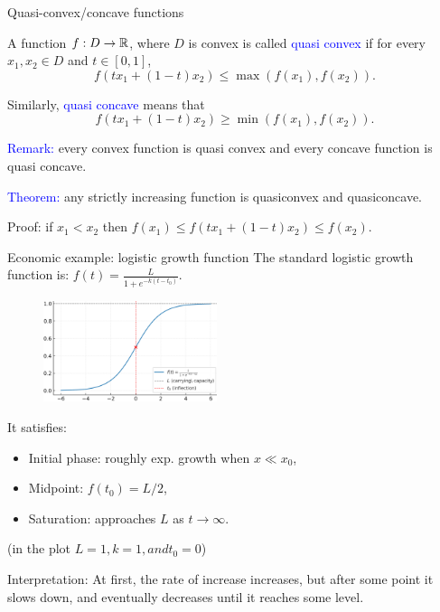 \documentclass[11pt,aspectratio=169]{beamer}
\begin{document}
\begin{frame}{Quasi-convex/concave functions}


A function $f:D \rightarrow \mathbb R$, where $D$ is convex is called \textcolor{blue}{quasi convex} if for every  $x_1,x_2 \in D$ and $t \in [0,1]$, 
$$f(t x_1+(1-t)x_2)\leq \max(f(x_1), f(x_2)).$$


Similarly, \textcolor{blue}{quasi concave} means that
$$f(t x_1+(1-t)x_2)\geq \min(f(x_1), f(x_2)).$$

\vskip 12pt
\textcolor{blue}{Remark:} every convex function is quasi convex and every concave function is quasi concave.
\vskip 12pt

\textcolor{blue}{Theorem:} any strictly increasing function is quasiconvex and quasiconcave.

\begin{tiny} Proof: if $x_1<x_2$ then $f(x_1) \leq f(t x_1+(1-t)x_2)\leq f(x_2)$.\end{tiny}\end{frame}

\begin{frame}{Economic example: logistic growth function}
The standard logistic growth function is: 
$f(t) = \frac{L}{1 + e^{-k(t - t_0)}}$.\\[3mm]
\begin{minipage}{6cm}{}
	\begin{figure}
\includegraphics[width=2in]{img/returns1.png} 
\end{figure}
\end{minipage}\begin{minipage}{9cm}{}
	It satisfies:
	\begin{itemize}
		\item Initial phase: roughly exp. growth when $x \ll x_0$,
		\item Midpoint: $f(t_0) = L/2$,
		\item Saturation: approaches $L$ as $t \to \infty$.
	\end{itemize}
	(in the plot $L = 1, k = 1, and t_0 = 0$)
\end{minipage}

Interpretation: At first, the rate of increase increases, but after some point it slows down, and eventually decreases  until it reaches some level. 
\end{frame}
\end{document}
